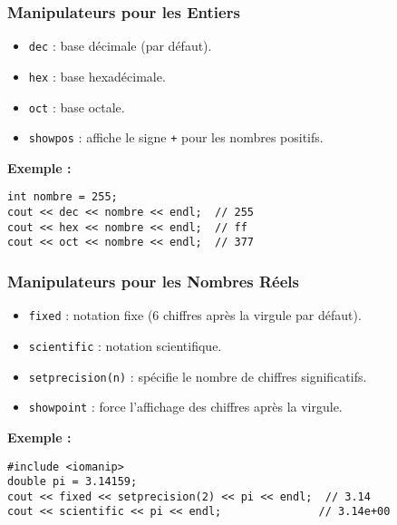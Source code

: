 \subsubsection{ Manipulateurs pour les Entiers}
\begin{itemize}
    \item \texttt{dec} : base décimale (par défaut).
    \item \texttt{hex} : base hexadécimale.
    \item \texttt{oct} : base octale.
    \item \texttt{showpos} : affiche le signe \texttt{+} pour les nombres positifs.
\end{itemize}

\textbf{Exemple :}
\begin{tcolorbox}[colframe=blue!50!black, colback=blue!5!white, title=Exemple de Manipulateurs pour les Entiers]
\begin{verbatim}
int nombre = 255;
cout << dec << nombre << endl;  // 255
cout << hex << nombre << endl;  // ff
cout << oct << nombre << endl;  // 377
\end{verbatim}
\end{tcolorbox}

\subsubsection{ Manipulateurs pour les Nombres Réels}
\begin{itemize}
    \item \texttt{fixed} : notation fixe (6 chiffres après la virgule par défaut).
    \item \texttt{scientific} : notation scientifique.
    \item \texttt{setprecision(n)} : spécifie le nombre de chiffres significatifs.
    \item \texttt{showpoint} : force l'affichage des chiffres après la virgule.
\end{itemize}

\textbf{Exemple :}
\begin{tcolorbox}[colframe=blue!50!black, colback=blue!5!white, title=Exemple de Manipulateurs pour les Nombres Réels]
\begin{verbatim}
#include <iomanip>
double pi = 3.14159;
cout << fixed << setprecision(2) << pi << endl;  // 3.14
cout << scientific << pi << endl;               // 3.14e+00
\end{verbatim}
\end{tcolorbox}

